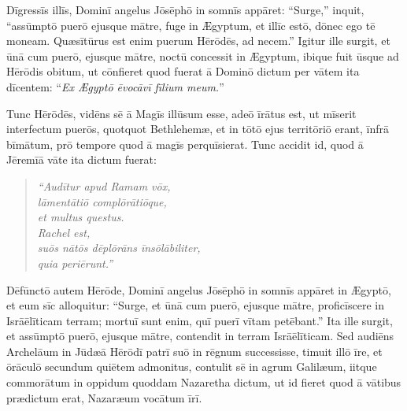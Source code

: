 \Versus Dīgressīs illīs, Dominī angelus Jōsēphō in somnīs appāret: ``Surge,'' inquit, ``assūm\-ptō puerō ejusque mātre, fuge in Ægyptum, et illīc estō, dōnec ego tē moneam. Quæsī\-tūrus est enim puerum Hērōdēs, ad necem.'' 
\Versus Igitur ille surgit, et ūnā cum puerō, ejusque mātre, noctū concessit in Ægyptum, 
\Versus ibique fuit ūsque ad Hērōdis obitum, ut cōnfieret quod fuerat ā Dominō dictum per vātem ita dīcentem: ``\emph{Ex Ægyptō ēvocāvī fīlium meum.}''

\Versus Tunc Hērōdēs, vidēns sē ā Magīs illūsum esse, adeō īrātus est, ut mīserit interfectum puerōs, quotquot Bethlehemæ, et in tōtō ejus territōriō erant, īnfrā bīmātum, prō tempore quod ā magīs perquīsierat. 
\Versus Tunc accidit id, quod ā Jēremīā vāte ita dictum fuerat: 

\begin{verse}
\begin{patverse*}
\Versus \emph{``Audītur apud Ramam vōx,\\
lāmentātiō complōrātiōque,\\
et multus questus.\\
Rachel est,\\
suōs nātōs dēplōrāns īnsōlābiliter,\\
quia periērunt.''}
\end{patverse*}
\end{verse}

\Versus Dēfūnctō autem Hērōde, Dominī angelus Jōsēphō in somnīs appāret in Ægyptō, 
\Versus et eum sīc alloquitur: ``Surge, et ūnā cum puerō, ejusque mātre, proficīscere in Isrāēlīticam terram; mortuī sunt enim, quī puerī vītam petēbant.'' 
\Versus Ita ille surgit, et assūmptō puerō, ejusque mātre, contendit in terram Isrāēlīticam. 
\Versus Sed audiēns Archelāum in Jūdæā Hērōdī patrī suō in rēgnum successisse, timuit illō īre, et ōrāculō secundum quiētem admonitus, contulit sē in agrum Galilæum, 
\Versus iitque commorātum in oppidum quoddam Nazaretha dictum, ut id fieret quod ā vātibus prædictum erat, Nazaræum vocātum īrī.
 


